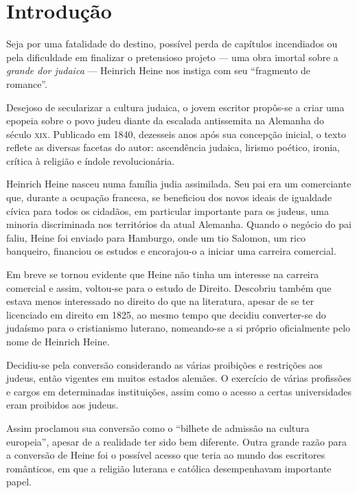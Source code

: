 \documentclass[12pt]{extarticle}
\begin{document}
\tableofcontents

\section{Introdução}

Seja por uma fatalidade do destino, possível perda de capítulos 
incendiados ou pela dificuldade em finalizar o pretensioso projeto --- uma 
obra imortal sobre a \emph{grande dor judaica} --- Heinrich Heine nos 
instiga com seu ``fragmento de romance''.

Desejoso de secularizar a cultura judaica, o jovem escritor propôs-se 
a criar uma epopeia sobre o povo judeu diante da escalada antissemita 
na Alemanha do século \textsc{xix}.
Publicado em 1840, dezesseis anos após sua concepção inicial, 
o texto reflete as diversas facetas do autor:
ascendência judaica, lirismo poético, ironia, crítica 
à religião e índole revolucionária.

Heinrich Heine nasceu numa família judia assimilada. Seu pai era 
um comerciante que, durante a ocupação francesa, se beneficiou dos 
novos ideais de igualdade cívica para todos os cidadãos, 
em particular importante para os judeus, uma minoria 
discriminada nos territórios da atual Alemanha. 
Quando o negócio do pai faliu, Heine foi enviado 
para Hamburgo, onde um tio Salomon, um rico banqueiro, 
financiou os estudos e encorajou-o a iniciar uma carreira comercial.

Em breve se tornou evidente que Heine não tinha um interesse 
na carreira comercial e assim, voltou-se para o estudo de Direito. 
Descobriu também que estava menos interessado no direito do que 
na literatura, apesar de se ter licenciado em direito em 1825, 
ao mesmo tempo que decidiu converter-se do judaísmo para o 
cristianismo luterano, nomeando-se a si próprio oficialmente pelo nome de Heinrich Heine.

Decidiu-se pela conversão considerando as várias proibições e 
restrições aos judeus, então vigentes em muitos estados alemães. 
O exercício de várias profissões e cargos em determinadas 
instituições, assim como o acesso a certas universidades eram proibidos aos judeus. 

Assim proclamou sua conversão como o ``bilhete de admissão na cultura europeia'', 
apesar de a realidade ter sido bem diferente. Outra grande 
razão para a conversão de Heine foi o possível acesso que teria 
ao mundo dos escritores românticos, em que a religião luterana e 
católica desempenhavam importante papel.
\end{document}

